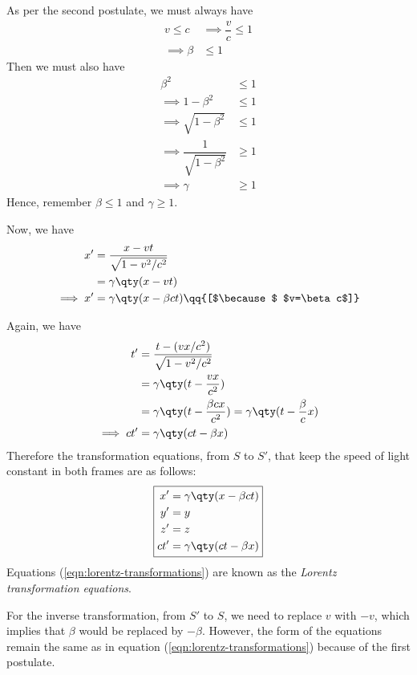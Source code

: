 	As per the second postulate, we must always have
	\begin{align*}
		v\leqslant c&\implies\dfrac{v}{c}\leqslant 1 \\
		\implies\beta&\leqslant 1
	\end{align*}
	Then we must also have
	\begin{align*}
		\beta^2&\leqslant 1 \\
		\implies 1-\beta^2&\leqslant 1 \\
		\implies\sqrt{1-\beta^2}&\leqslant 1 \\
		\implies\dfrac{1}{\sqrt{1-\beta^2}}&\geqslant 1 \\
		\implies\gamma&\geqslant 1
	\end{align*}
	Hence, remember $\boxed{\beta\leqslant 1}$ and $\boxed{\gamma\geqslant 1}$.
	
	Now, we have
	\begin{align*}
		x'&=\dfrac{x-vt}{\sqrt{1-v^2/c^2}} \\
			&=\gamma\qty(x-vt) \\
		\implies x'&=\gamma\qty(x-\beta ct)\qq{[$\because$ $v=\beta c$]}
	\end{align*}
	
	Again, we have
	\begin{align*}
		t'&=\dfrac{t-(vx/c^2)}{\sqrt{1-v^2/c^2}} \\
			&=\gamma\qty(t-\dfrac{vx}{c^2}) \\
			&=\gamma\qty(t-\dfrac{\beta cx}{c^2})=\gamma\qty(t-\dfrac{\beta}{c}x) \\
		\implies ct'&=\gamma\qty(ct-\beta x)
	\end{align*}
	Therefore the transformation equations, from $S$ to $S'$, that keep the speed of light constant in both frames are as follows:
	\begin{equation} \label{eqn:lorentz-transformations}
		\boxed{
			\begin{aligned}
				x'&=\gamma\qty(x-\beta ct) \\
				y'&=y \\
				z'&=z \\
				ct'&=\gamma\qty(ct-\beta x)
			\end{aligned}
		}
	\end{equation}
	Equations (\ref{eqn:lorentz-transformations}) are known as the \emph{Lorentz transformation equations}.
	
	For the inverse transformation, from $S'$ to $S$, we need to replace $v$ with $-v$, which implies that $\beta$ would be replaced by $-\beta$. However, the form of the equations remain the same as in equation (\ref{eqn:lorentz-transformations}) because of the first postulate.
	
